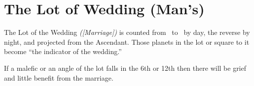 \section{The Lot of Wedding (Man's)}

The Lot of the Wedding \textsl{([Marriage])} is counted from \Saturn\, to \Venus\, by day, the reverse by night, and projected from the Ascendant. Those planets in the lot or square to it become ``the indicator of the wedding.''

If a malefic or an angle of the lot falls in the 6th or 12th then there will be grief and little benefit from the marriage.